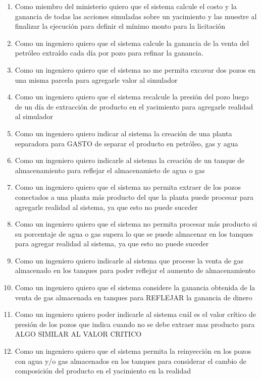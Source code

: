 \begin{enumerate}
  \item Como miembro del ministerio quiero que el sistema calcule el costo y la ganancia de todas las acciones simuladas sobre un yacimiento y las muestre al finalizar la ejecución para definir el mínimo monto para la licitación
  \item Como un ingeniero quiero que el sistema calcule la ganancia de la venta del petróleo extraído cada día por pozo para refinar la ganancia.
  \item Como un ingeniero quiero que el sistema no me permita excavar dos pozos en una misma parcela para agregarle valor al simulador
  \item Como un ingeniero quiero que el sistema recalcule la presión del pozo luego de un día de extracción de producto en el yacimiento para agregarle realidad al simulador
  \item Como un ingeniero quiero indicar al sistema la creación de una planta separadora para GASTO de separar el producto en petróleo, gas y agua
  \item Como un ingeniero quiero indicarle al sistema la creación de un tanque de almacenamiento para reflejar el almacenamieto de agua o gas
  \item Como un ingeniero quiero que el sistema no permita extraer de los pozos conectados a una planta más producto del que la planta puede procesar para agregarle realidad al sistema, ya que esto no puede suceder
  \item Como un ingeniero quiero que el sistema no permita procesar más producto si su porcentaje de agua o gas supera lo que se puede almacenar en los tanques para agregar realidad al sistema, ya que esto no puede suceder
  \item Como un ingeniero quiero indicarle al sistema que procese la venta de gas almacenado en los tanques para poder reflejar el aumento de almacenamiento
  \item Como un ingeniero quiero que el sistema considere la ganancia obtenida de la venta de gas almacenada en tanques para REFLEJAR la ganancia de dinero
  \item Como un ingeniero quiero poder indicarle al sistema cuál es el valor crítico de presión de los pozos que indica cuando no se debe extraer mas producto para ALGO SIMILAR AL VALOR CRITICO
  \item Como un ingeniero quiero que el sistema permita la reinyección en los pozos con agua y/o gas almacenados en los tanques para considerar el cambio de composición del producto en el yacimiento en la realidad

\end{enumerate}
